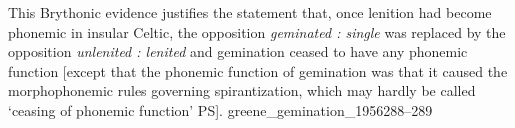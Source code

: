 {  This Brythonic evidence justifies the statement that, once lenition had become phonemic in insular Celtic, the opposition \textit{geminated : single} was replaced by the opposition \textit{unlenited : lenited} and gemination ceased to have any phonemic function [except that the phonemic function of gemination was that it caused the morphophonemic rules governing spirantization, which may hardly be called `ceasing of phonemic function' PS].
}{greene_gemination_1956}{288--289}

